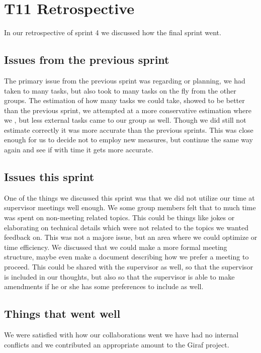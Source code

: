 \section{\gls{T11} Retrospective}

In our retrospective of sprint 4 we discussed how the final sprint went.

\subsection{Issues from the previous sprint}
The primary issue from the previous sprint was regarding or planning, we had taken to many tasks, but also took to many tasks on the fly from the other groups.
The estimation of how many tasks we could take, showed to be better than the previous sprint, we attempted at a more conservative estimation where we , but less external tasks came to our group as well. Though we did still not estimate correctly it was more accurate than the previous  sprints. This was close enough for us to decide not to employ new measures, but continue the same way again and see if with time it gets more accurate.

\subsection{Issues this sprint}
One of the things we discussed this sprint was that we did not utilize our time at supervisor meetings well enough. We some group members felt that to much time was spent on non-meeting related topics. This could be things like jokes or elaborating on technical details which were not related to the topics we wanted feedback on. This was not a majore issue, but an area where we could optimize or time efficiency.
We discussed that we could make a more formal meeting structure, maybe even make a document describing how we prefer a meeting to proceed. This could be shared with the supervisor as well, so that the supervisor is included in our thoughts, but also so that the supervisor is able to make amendments if he or she has some preferences to include as well.

\subsection{Things that went well}
We were satisfied with how our collaborations went we have had no internal conflicts and we contributed  an appropriate amount to the Giraf project. 
